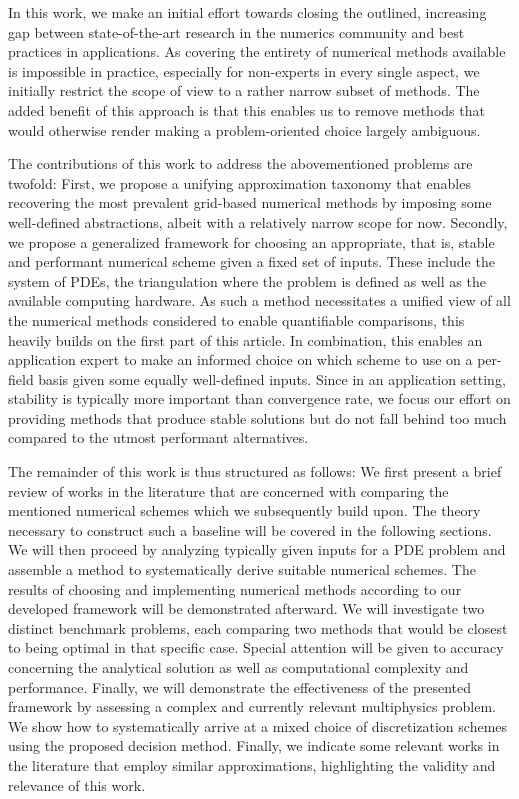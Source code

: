 \documentclass[asi,article,submit,moreauthors]{Definitions/mdpi}
\begin{document}
In this work, we make an initial effort towards closing the outlined, increasing gap between state-of-the-art research in the numerics community and best practices in applications.
As covering the entirety of numerical methods available is impossible in practice, especially for non-experts in every single aspect, we initially restrict the scope of view to a rather narrow subset of methods.
The added benefit of this approach is that this enables us to remove methods that would otherwise render making a problem-oriented choice largely ambiguous.

The contributions of this work to address the abovementioned problems are twofold:
First, we propose a unifying approximation taxonomy that enables recovering the most prevalent grid-based numerical methods by imposing some well-defined abstractions, albeit with a relatively narrow scope for now.
Secondly, we propose a generalized framework for choosing an appropriate, that is, stable and performant numerical scheme given a fixed set of inputs.
These include the system of PDEs, the triangulation where the problem is defined as well as the available computing hardware.
As such a method necessitates a unified view of all the numerical methods considered to enable quantifiable comparisons, this heavily builds on the first part of this article.
In combination, this enables an application expert to make an informed choice on which scheme to use on a per-field basis given some equally well-defined inputs.
Since in an application setting, stability is typically more important than convergence rate, we focus our effort on providing methods that produce stable solutions but do not fall behind too much compared to the utmost performant alternatives.

The remainder of this work is thus structured as follows:
We first present a brief review of works in the literature that are concerned with comparing the mentioned numerical schemes which we subsequently build upon.
The theory necessary to construct such a baseline will be covered in the following sections.
We will then proceed by analyzing typically given inputs for a PDE problem and assemble a method to systematically derive suitable numerical schemes.
The results of choosing and implementing numerical methods according to our developed framework will be demonstrated afterward.
We will investigate two distinct benchmark problems, each comparing two methods that would be closest to being optimal in that specific case.
Special attention will be given to accuracy concerning the analytical solution as well as computational complexity and performance.
Finally, we will demonstrate the effectiveness of the presented framework by assessing a complex and currently relevant multiphysics problem.
We show how to systematically arrive at a mixed choice of discretization schemes using the proposed decision method. Finally, we indicate some relevant works in the literature that employ similar approximations, highlighting the validity and relevance of this work.
\end{document}
